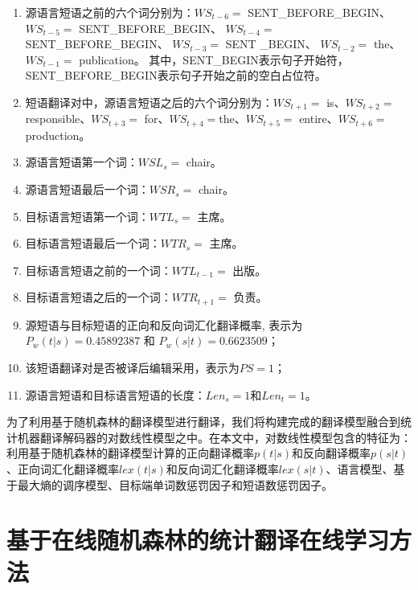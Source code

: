 \begin{enumerate}[(1)]
	\item 源语言短语之前的六个词分别为：$WS_{t-6} =$ SENT\_BEFORE\_BEGIN、 $WS_{t-5} =$ SENT\_BEFORE\_BEGIN、 $WS_{t-4} =$ SENT\_BEFORE\_BEGIN、 $WS_{t-3} =$ SENT \_BEGIN、 $WS_{t-2} =$ the、 $WS_{t-1} =$ publication。 其中，SENT\_BEGIN表示句子开始符， SENT\_BEFORE\_BEGIN表示句子开始之前的空白占位符。
	
	\item 短语翻译对中，源语言短语之后的六个词分别为：$WS_{t+1}=$ is、$WS_{t+2}=$ responsible、$WS_{t+3}=$ for、$WS_{t+4}=$the、$WS_{t+5}=$ entire、$WS_{t+6}=$ production。
	
	\item 源语言短语第一个词：$WSL_s=$ chair。
	
	\item 源语言短语最后一个词：$WSR_s=$ chair。
	
	\item 目标语言短语第一个词：$WTL_s=$ 主席。
	
	\item 目标语言短语最后一个词：$WTR_s=$ 主席。
	
	\item 目标语言短语之前的一个词：$WTL_{t-1}=$ 出版。
	
	\item 目标语言短语之后的一个词：$WTR_{t+1}=$ 负责。
	
	\item 源短语与目标短语的正向和反向词汇化翻译概率, 表示为$P_w(t|s) = 0.45892387$ 和 $P_w(s|t) = 0.6623509$；
	
	\item 该短语翻译对是否被译后编辑采用，表示为$PS=1$；
	
	\item 源语言短语和目标语言短语的长度：$Len_s=1$和$Len_t=1$。
\end{enumerate}

为了利用基于随机森林的翻译模型进行翻译，我们将构建完成的翻译模型融合到统计机器翻译解码器的对数线性模型之中。在本文中，对数线性模型包含的特征为：利用基于随机森林的翻译模型计算的正向翻译概率$p(t|s)$和反向翻译概率$p(s|t)$、正向词汇化翻译概率$lex(t|s)$和反向词汇化翻译概率$lex(s|t)$、语言模型、基于最大熵的调序模型、目标端单词数惩罚因子和短语数惩罚因子。

\section{基于在线随机森林的统计翻译在线学习方法}

